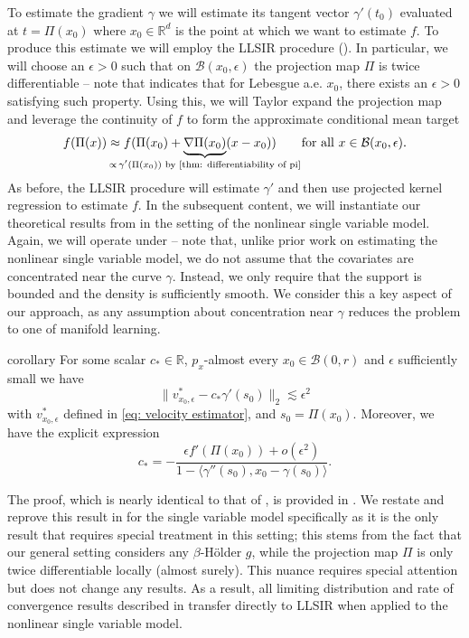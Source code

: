 \documentclass[11pt]{article}
\begin{document}
To estimate the gradient $\gamma$ we will estimate its tangent vector $\gamma'(t_0)$ evaluated at $t = \Pi(x_0)$ where $x_0\in \mathbb{R}^d$ is the point at which we want to estimate $f$. To produce this estimate we will employ the LLSIR procedure (). In particular, we will choose an $\epsilon > 0$ such that on $\mathcal{B}(x_0, \epsilon)$ the projection map $\Pi$ is twice differentiable -- note that  indicates that for Lebesgue a.e. $x_0$, there exists an $\epsilon > 0$ satisfying such property. Using this, we will Taylor expand the projection map and leverage the continuity of $f$ to form the approximate conditional mean target
\begin{equation} \label{eq: surrogate decomposition colloquial}
    f(\Pi(x)) \approx f(\Pi(x_0) + \underbrace{\nabla\Pi(x_0)}_{\mathclap{\propto\, \gamma'(\Pi(x_0)) \text{ by \Cref{thm: differentiability of pi}}}}(x - x_0)) \qquad \text{for all }x \in \mathcal{B}(x_0, \epsilon).
\end{equation}
As before, the LLSIR procedure will estimate $\gamma'$ and then use projected kernel regression to estimate $f$. In the subsequent content, we will instantiate our theoretical results from  in the setting of the nonlinear single variable model. Again, we will operate under  -- note that, unlike prior work on estimating the nonlinear single variable model, we do not assume that the covariates are concentrated near the curve $\gamma$. Instead, we only require that the support is bounded and the density is sufficiently smooth. We consider this a key aspect of our approach, as any assumption about concentration near $\gamma$ reduces the problem to one of manifold learning. 

\begin{restatable}{corollary}{}\label{corollary: population prop curve}
    For some scalar $c_* \in \mathbb{R}$, $p_x$-almost every $x_0 \in \mathcal{B}(0, r)$ and $\epsilon$ sufficiently small we have 
    \[\|v^*_{x_0, \epsilon} - c_*\gamma'(s_0)\|_2 \lesssim \epsilon^2\]
    with $v^*_{x_0, \epsilon}$ defined in \cref{eq: velocity estimator}, and  $s_0 = \Pi(x_0)$. Moreover, we have the explicit expression
    \[c_* = -\frac{\epsilon f'(\Pi(x_0))+ o(\epsilon^2)}{1 - \langle \gamma''(s_0), x_0 - \gamma(s_0)\rangle}.\]
\end{restatable}

The proof, which is nearly identical to that of , is provided in . We restate and reprove this result in for the single variable model specifically as it is the only result that requires special treatment in this setting; this stems from the fact that our general setting considers any $\beta$-H\"older $g$, while the projection map $\Pi$ is only twice differentiable locally (almost surely). This nuance requires special attention but does not change any results. As a result, all limiting distribution and rate of convergence results described in  transfer directly to LLSIR when applied to the nonlinear single variable model.
\end{document}
